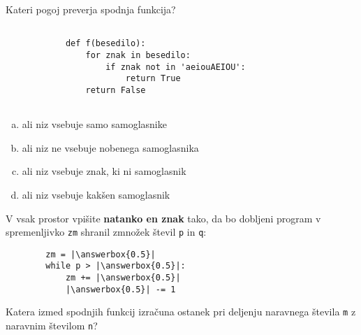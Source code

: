 \documentclass[arhiv, 10pt]{../izpit}
\newcommand{\inlinepy}[1]{\texttt{#1}}
\newcommand{\answerbox}[1]{\framebox{\vphantom{\large M}\hspace{#1cm}}}
\begin{document}
        \naloga*

        \begin{multicols}{2}
        \noindent
        Kateri pogoj preverja spodnja funkcija?
        \begin{verbatim}
        
            def f(besedilo):
                for znak in besedilo:
                    if znak not in 'aeiouAEIOU':
                        return True
                return False
            
        \end{verbatim}

        \begin{enumerate}[(a)]
\item ali niz vsebuje samo samoglasnike
\item ali niz ne vsebuje nobenega samoglasnika
\item ali niz vsebuje znak, ki ni samoglasnik
\item ali niz vsebuje kakšen samoglasnik
\end{enumerate}

        \end{multicols}
    
        \naloga*
        \begin{multicols}{2}
        \noindent
        V vsak prostor vpišite \textbf{natanko en znak} tako, da bo dobljeni program v spremenljivko \inlinepy{zm} shranil zmnožek števil \inlinepy{p} in \inlinepy{q}:
        
        \columnbreak
        \begin{verbatim}
        zm = |\answerbox{0.5}|
        while p > |\answerbox{0.5}|:
            zm += |\answerbox{0.5}|
            |\answerbox{0.5}| -= 1
        \end{verbatim}
        \end{multicols}
    
        \clearpage
        \naloga
        
        Katera izmed spodnjih funkcij izračuna ostanek pri deljenju naravnega števila \inlinepy{m} z naravnim številom \inlinepy{n}?
    
\end{document}
